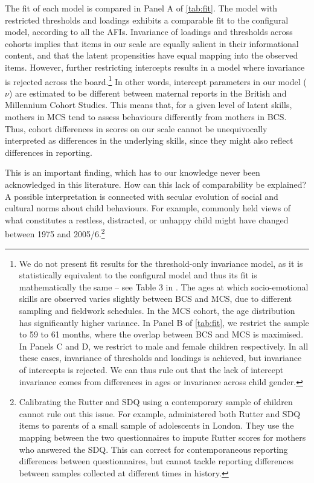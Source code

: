 The fit of each model is compared in Panel A of \autoref{tab:fit}. The model with restricted thresholds and loadings exhibits a comparable fit to the configural model, according to all the AFIs. Invariance of loadings and thresholds across cohorts implies that items in our scale are equally salient in their informational content, and that the latent propensities have equal mapping into the observed items. However, further restricting intercepts results in a model where invariance is rejected across the board.\footnote{We do not present fit results for the threshold-only invariance model, as it is statistically equivalent to the configural model and thus its fit is mathematically the same -- see Table 3 in \citealp{Wu2016a}. The ages at which socio-emotional skills are observed varies slightly between BCS and MCS, due to different sampling and fieldwork schedules. In the MCS cohort, the age distribution has significantly higher variance. In Panel B of \autoref{tab:fit}, we restrict the sample to 59 to 61 months, where the overlap between BCS and MCS is maximised. In Panels C and D, we restrict to male and female children respectively. In all these cases, invariance of thresholds and loadings is achieved, but invariance of intercepts is rejected. We can thus rule out that the lack of intercept invariance comes from differences in ages or invariance across child gender.} In other words, intercept parameters in our model ($\nu$) are estimated to be different between maternal reports in the British and Millennium Cohort Studies. This means that, for a given level of latent skills, mothers in MCS tend to assess behaviours differently from mothers in BCS. Thus, cohort differences in scores on our scale cannot be unequivocally interpreted as differences in the underlying skills, since they might also reflect differences in reporting.

This is an important finding, which has to our knowledge never been acknowledged in this literature. How can this lack of comparability be explained?  A possible interpretation is connected with secular evolution of social and cultural norms about child behaviours. For example, commonly held views of what constitutes a restless, distracted, or unhappy child might have changed between 1975 and 2005/6.\footnote{Calibrating the Rutter and SDQ using a contemporary sample of children cannot rule out this issue. For example, \citet{Collishaw2004} administered both Rutter and SDQ items to parents of a small sample of adolescents in London. They use the mapping between the two questionnaires to impute Rutter scores for mothers who answered the SDQ. This can correct for contemporaneous reporting differences between questionnaires, but cannot tackle reporting differences between samples collected at different times in history.}

